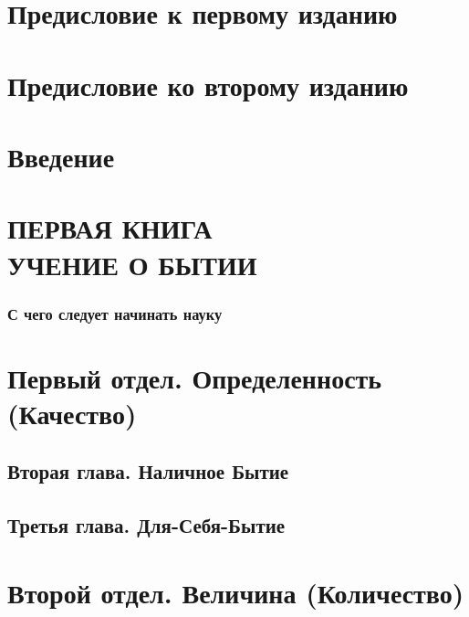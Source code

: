 \documentclass[b5paper, 11pt, twoside, onecolumn, openany]{memoir}
\begin{document}
\mainmatter

\part[Предисловие к первому изданию]{Предисловие к первому изданию}


\part[Предисловие ко второму изданию]{Предисловие ко второму изданию}


\part[Введение]{Введение}


\part[Первая книга. Учение о бытии]{\mdseries ПЕРВАЯ КНИГА \\ \bfseries УЧЕНИЕ О БЫТИИ}
\section[С чего следует начинать науку]{С чего следует начинать науку}
\pagestyle{plain}
\setcounter{page}{1}


\part[Первый отдел \\ ОПРЕДЕЛЕННОСТЬ (КАЧЕСТВО)]{Первый отдел. Определенность (Качество)}


\chapter[{\em Вторая глава} Наличное Бытие]{Вторая глава. Наличное Бытие}


\chapter[{\em Третья глава} Для-себя-бытие]{ Третья глава. Для-Себя-Бытие}



\part[{\em Второй отдел} \\ ВЕЛИЧИНА (КОЛИЧЕСТВО)]{Второй отдел. Величина (Количество)}

\end{document}
